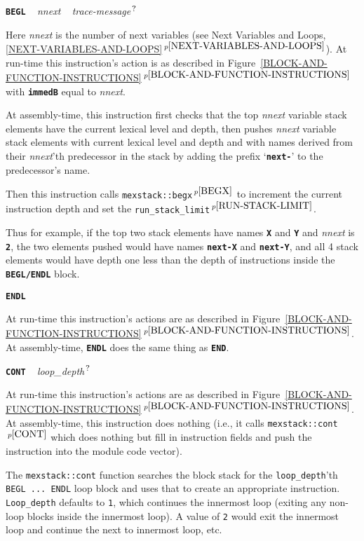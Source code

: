 \documentclass[12pt]{article}
\makeatletter
\newcommand{\TT}[1]{{\tt \bfseries #1}}
\newcommand{\QMARK}{{$^{\,\mbox{\footnotesize ?}}$}}
\newcommand{\ttkey}[1]{\TT{#1}\index{#1@{\tt #1}}}
\newcommand{\itemref}[1]{\ref{#1}$\,^{p\pageref{#1}}$}
\newcommand{\pagnote}[1]{$\,^{p\pageref{#1}}$}
\newenvironment{indpar}[1][0.3in]%
	{\begin{list}{}%
		     {\setlength{\itemsep}{0in}%
		      \setlength{\topsep}{0in}%
		      \setlength{\parsep}{1ex}%
		      \setlength{\labelwidth}{#1}%
		      \setlength{\leftmargin}{#1}%
		      \addtolength{\leftmargin}{\labelsep}}%
	 \item}%
	{\end{list}}
\makeatother
\begin{document}
\ttkey{BEGL} ~ {\em nnext} ~ {\em trace-message}\QMARK{}
\begin{indpar}
Here {\em nnext} is the number of next variables
(see Next Variables and Loops, \itemref{NEXT-VARIABLES-AND-LOOPS}).
At run-time this instruction's action is as described in
Figure~\itemref{BLOCK-AND-FUNCTION-INSTRUCTIONS} with \TT{immedB} equal
to {\em nnext}.

At assembly-time, this instruction first checks that the
top {\em nnext} variable stack elements have the current lexical level
and depth,
then pushes {\em nnext} variable stack elements with current lexical
level and depth
and with names derived from their {\em nnext}'th predecessor
in the stack by adding the prefix `\TT{next-}'\label{NEXT-VARIABLE}
to the predecessor's
name.

Then this instruction calls
{\tt mexstack::begx}\pagnote{BEGX} to increment
the current instruction depth and set the
{\tt run\_stack\_limit}\pagnote{RUN-STACK-LIMIT}.

Thus for example, if the top two stack elements have names
\TT{X} and \TT{Y} and {\em nnext} is \TT{2}, the two elements
pushed would have names \TT{next-X} and \TT{next-Y}, and
all 4 stack elements would have depth one less than the depth
of instructions inside the \TT{BEGL/ENDL} block.
\end{indpar}

\ttkey{ENDL}
\begin{indpar}
At run-time this instruction's actions are as described in
Figure~\itemref{BLOCK-AND-FUNCTION-INSTRUCTIONS}.  At assembly-time,
\TT{ENDL} does the same thing as \TT{END}.
\end{indpar}

\ttkey{CONT} ~ {\em loop\_depth}\QMARK{}
\begin{indpar}
At run-time this instruction's actions are as described in
Figure~\itemref{BLOCK-AND-FUNCTION-INSTRUCTIONS}.  At assembly-time,
this instruction does nothing (i.e., it calls {\tt mexstack::cont}\pagnote{CONT}
which does nothing but fill in instruction fields and push the instruction
into the module code vector).

The {\tt mexstack::cont} function
searches the block stack for the {\tt loop\_depth}'th {\tt BEGL ...~ENDL}
loop block and uses that to create an appropriate instruction.
{\tt Loop\_depth} defaults to {\tt 1}, which continues the innermost
loop (exiting any non-loop blocks inside the innermost loop).
A value of {\tt 2} would exit the innermost loop and continue
the next to innermost loop, etc.
\end{indpar}
\end{document}
